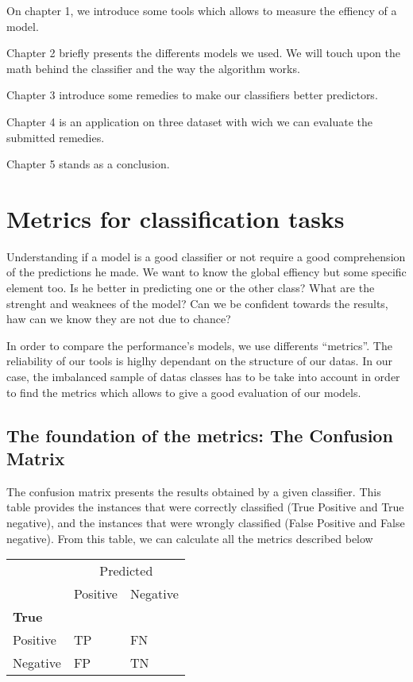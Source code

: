 \documentclass[
]{report}
\begin{document}
On chapter 1, we introduce some tools which allows to measure the effiency of a model.

Chapter 2 briefly presents the differents models we used. We will touch upon the math behind the classifier and the way the algorithm works.

Chapter 3 introduce some remedies to make our classifiers better predictors.

Chapter 4 is an application on three dataset with wich we can evaluate the submitted remedies.

Chapter 5 stands as a conclusion.

\hypertarget{metrics-for-classification-tasks}{%
\chapter{Metrics for classification tasks}\label{metrics-for-classification-tasks}}

Understanding if a model is a good classifier or not require a good comprehension of the predictions he made. We want to know the global effiency but some specific element too. Is he better in predicting one or the other class? What are the strenght and weaknees of the model? Can we be confident towards the results, haw can we know they are not due to chance?

In order to compare the performance's models, we use differents ``metrics''. The reliability of our tools is higlhy dependant on the structure of our datas. In our case, the imbalanced sample of datas classes has to be take into account in order to find the metrics which allows to give a good evaluation of our models.

\hypertarget{the-foundation-of-the-metrics-the-confusion-matrix}{%
\section{The foundation of the metrics: The Confusion Matrix}\label{the-foundation-of-the-metrics-the-confusion-matrix}}

The confusion matrix presents the results obtained by a given classifier. This table provides the instances that were correctly classified (True Positive and True negative), and the instances that were wrongly classified (False Positive and False negative).
From this table, we can calculate all the metrics described below

\begin{table}
\centering
\begin{tabular}{l|l|l}
\hline
\multicolumn{1}{c|}{ } & \multicolumn{2}{c}{Predicted} \\
\cline{2-3}
  & Positive & Negative\\
\hline
\multicolumn{3}{l}{\textbf{True}}\\
\hline
\hspace{1em}Positive & TP & FN\\
\hline
\hspace{1em}Negative & FP & TN\\
\hline
\end{tabular}
\end{table}
\end{document}
